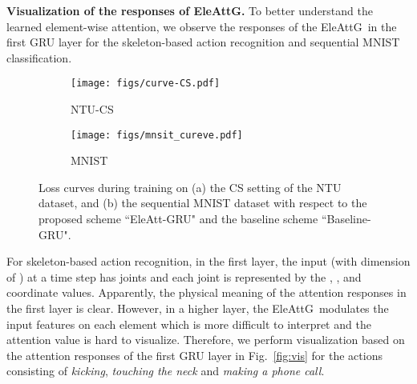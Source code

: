 \documentclass[journal]{IEEEtran}
\newcommand{\EleAttGn}{{EleAttG}}
\newcommand{\EleAttG}{{EleAttG~}}
\begin{document}
\textbf{Visualization of the responses of \EleAttGn.} To better understand the learned element-wise attention, we observe the responses of the \EleAttG in the first GRU layer for the skeleton-based action recognition and sequential MNIST classification. 








\begin{figure*}[!]
	\centering
	\begin{subfigure}[t]{0.41\linewidth}
		\centering\texttt{[image: figs/curve-CS.pdf]}
		\caption{NTU-CS}
		\label{subfig:CS}
	\end{subfigure}	
	\hfil
	\begin{subfigure}[t]{0.41\linewidth}
    	\centering\texttt{[image: figs/mnsit\_cureve.pdf]}
    	\caption{MNIST}			
    	\label{subfig:CV}
    \end{subfigure}
	\caption{Loss curves during training on (a) the CS setting of the NTU dataset, and (b) the sequential MNIST dataset with respect to the proposed scheme ``EleAtt-GRU" and the baseline scheme ``Baseline-GRU".}
	\label{fig:curve}
\end{figure*}



For skeleton-based action recognition, in the first layer, the input (with dimension of ) at a time step has  joints and each joint is represented by the , , and  coordinate values. Apparently, the physical meaning of the attention responses in the first layer is clear. However, in a higher layer, the \EleAttG modulates the input features on each element which is more difficult to interpret and the attention value is hard to visualize. Therefore, we perform visualization based on the attention responses of the first GRU layer in Fig.~\ref{fig:vis} for the actions consisting of \emph{kicking}, \emph{touching the neck} and \emph{making a phone call}. 
\end{document}
